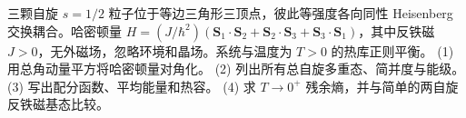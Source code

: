 三颗自旋 \(s=1/2\) 粒子位于等边三角形三顶点，彼此等强度各向同性 Heisenberg 交换耦合。哈密顿量 \(H=(J/\hbar^2)(\boldsymbol S_1\cdot\boldsymbol S_2+\boldsymbol S_2\cdot\boldsymbol S_3+\boldsymbol S_3\cdot\boldsymbol S_1)\)，其中反铁磁 \(J>0\)，无外磁场，忽略环境和晶场。系统与温度为 \(T>0\) 的热库正则平衡。
(1) 用总角动量平方将哈密顿量对角化。
(2) 列出所有总自旋多重态、简并度与能级。
(3) 写出配分函数、平均能量和热容。
(4) 求 \(T\to0^+\) 残余熵，并与简单的两自旋反铁磁基态比较。
